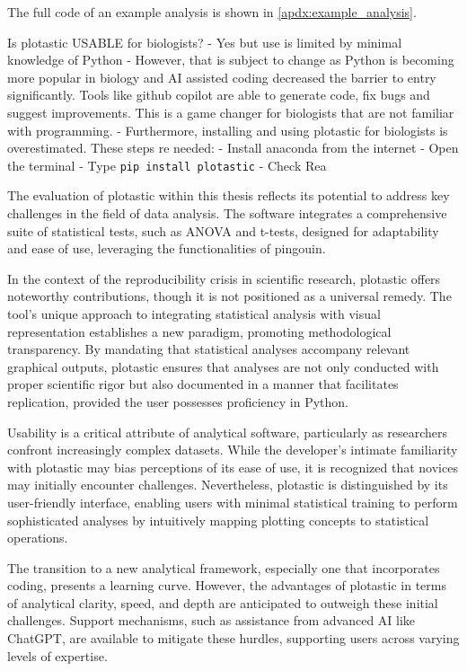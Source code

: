 
The full code of an example analysis is shown in \autoref{apdx:example_analysis}.


Is plotastic USABLE for biologists?
- Yes but use is limited by minimal knowledge of Python
- However, that is subject to change as Python is becoming more popular
in biology and AI assisted coding decreased the barrier to entry
significantly. Tools like github copilot are able to generate code, fix
bugs and suggest improvements. This is a game changer for biologists
that are not familiar with programming.
- Furthermore, installing and using plotastic for biologists is overestimated. These
steps re needed:
- Install anaconda from the internet
- Open the terminal
- Type \texttt{pip install plotastic}
- Check Rea


The evaluation of plotastic within this thesis reflects its potential to address
key challenges in the field of data analysis. The software integrates a
comprehensive suite of statistical tests, such as ANOVA and t-tests, designed
for adaptability and ease of use, leveraging the functionalities of pingouin.

In the context of the reproducibility crisis in scientific research, plotastic
offers noteworthy contributions, though it is not positioned as a universal
remedy. The tool's unique approach to integrating statistical analysis with
visual representation establishes a new paradigm, promoting methodological
transparency. By mandating that statistical analyses accompany relevant
graphical outputs, plotastic ensures that analyses are not only conducted with
proper scientific rigor but also documented in a manner that facilitates
replication, provided the user possesses proficiency in Python.

Usability is a critical attribute of analytical software, particularly as
researchers confront increasingly complex datasets. While the developer's
intimate familiarity with plotastic may bias perceptions of its ease of use, it
is recognized that novices may initially encounter challenges. Nevertheless,
plotastic is distinguished by its user-friendly interface, enabling users with
minimal statistical training to perform sophisticated analyses by intuitively
mapping plotting concepts to statistical operations.

The transition to a new analytical framework, especially one that incorporates
coding, presents a learning curve. However, the advantages of plotastic in terms
of analytical clarity, speed, and depth are anticipated to outweigh these
initial challenges. Support mechanisms, such as assistance from advanced AI like
ChatGPT, are available to mitigate these hurdles, supporting users across
varying levels of expertise.

